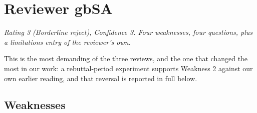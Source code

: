 
\section*{Reviewer gbSA}

\noindent\textit{Rating 3 (Borderline reject), Confidence 3. Four weaknesses, four questions,
plus a limitations entry of the reviewer's own.}

\vspace{0.4em}
\noindent
This is the most demanding of the three reviews, and the one that changed the most in our work:
a rebuttal-period experiment supports Weakness 2 against our own earlier reading, and that
reversal is reported in full below.

\subsection*{Weaknesses}

